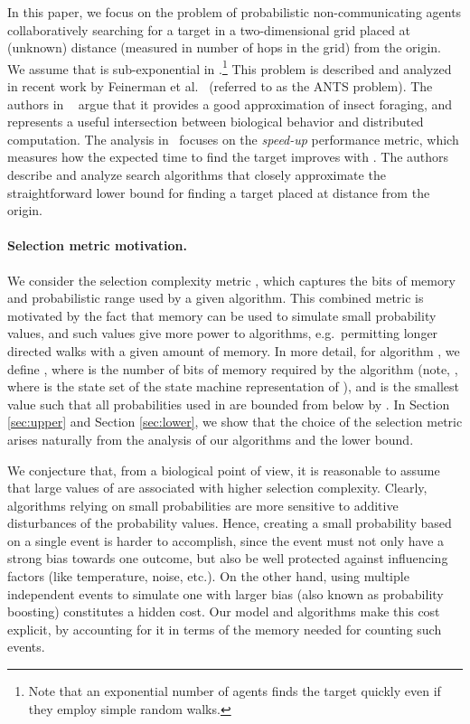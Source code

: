 \documentclass[11pt]{article}
\begin{document}
In this paper, we focus on the problem of  probabilistic non-communicating agents collaboratively searching for a target in a two-dimensional grid placed at (unknown) distance  (measured in number of hops in the grid) from the origin. We assume that  is sub-exponential in .\footnote{Note that an exponential number of agents finds the target quickly even if they employ simple random walks.} This problem is described and analyzed in recent work by Feinerman et al.~\cite{feinerman12podc} (referred to as the ANTS problem). The authors in ~\cite{feinerman12podc} argue that it provides a good approximation of insect foraging, and represents a useful intersection between biological behavior and distributed computation. The analysis in~\cite{feinerman12podc} focuses on the {\em speed-up} performance metric, which measures how the expected time to find the target improves with . The authors describe and analyze search algorithms that closely approximate the straightforward  lower bound for finding a target placed at distance  from the origin.
 
 \paragraph{Selection metric motivation.} We consider the selection complexity metric , which captures the bits of memory and probabilistic range used by a given algorithm. This combined metric is motivated by the fact that memory can be used to simulate small probability values, and such values give more power to algorithms, e.g.\ permitting longer directed walks with a given amount of memory. In more detail, for algorithm , we define , where  is the number of bits of memory required by the algorithm (note, , where  is the state set of the state machine representation of ), and  is the smallest value such that all probabilities used in  are bounded from below by . In Section \ref{sec:upper} and Section \ref{sec:lower}, we show that the choice of the selection metric arises naturally from the analysis of our algorithms and the lower bound.

We conjecture that, from a biological point of view, it is reasonable to assume that large values of  are associated with higher selection complexity. Clearly, algorithms relying on small probabilities are more sensitive to additive disturbances of the probability values. Hence, creating a small probability based on a single event is harder to accomplish, since the  event must not only have a strong bias towards one outcome, but also be well protected against influencing factors (like temperature, noise, etc.). On the other hand, using multiple independent events to simulate one with larger bias (also known as probability boosting) constitutes a hidden cost. Our model and algorithms make this cost explicit, by accounting for it in terms of the memory needed for counting such events.
\end{document}
